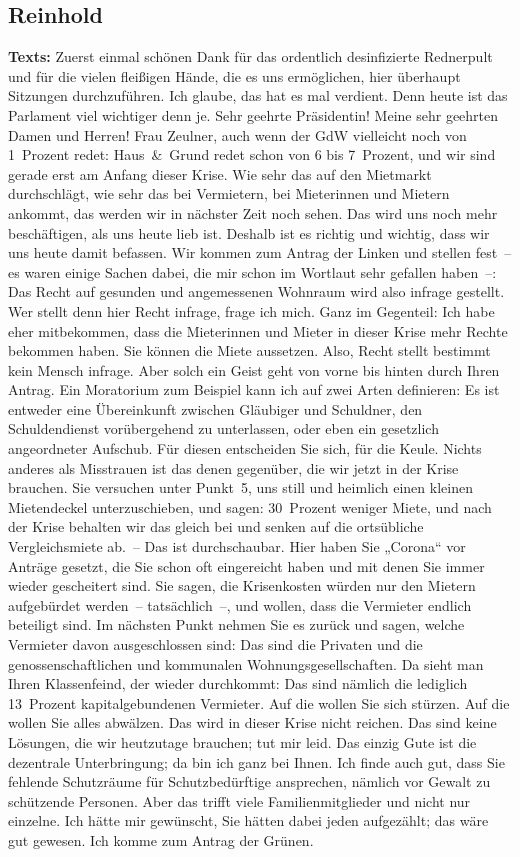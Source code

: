 \documentclass{article}
\begin{document}
\subsection{Reinhold}
\noindent\textbf{Texts:} Zuerst einmal schönen Dank für das ordentlich desinfizierte Rednerpult und für die vielen fleißigen Hände, die es uns ermöglichen, hier überhaupt Sitzungen durchzuführen.  Ich glaube, das hat es mal verdient. Denn heute ist das Parlament viel wichtiger denn je. Sehr geehrte Präsidentin! Meine sehr geehrten Damen und Herren! Frau Zeulner, auch wenn der GdW vielleicht noch von 1 Prozent redet: Haus \& Grund redet schon von 6 bis 7 Prozent, und wir sind gerade erst am Anfang dieser Krise. Wie sehr das auf den Mietmarkt durchschlägt, wie sehr das bei Vermietern, bei Mieterinnen und Mietern ankommt, das werden wir in nächster Zeit noch sehen. Das wird uns noch mehr beschäftigen, als uns heute lieb ist. Deshalb ist es richtig und wichtig, dass wir uns heute damit befassen. Wir kommen zum Antrag der Linken und stellen fest – es waren einige Sachen dabei, die mir schon im Wortlaut sehr gefallen haben –: Das Recht auf gesunden und angemessenen Wohnraum wird also infrage gestellt. Wer stellt denn hier Recht infrage, frage ich mich. Ganz im Gegenteil: Ich habe eher mitbekommen, dass die Mieterinnen und Mieter in dieser Krise mehr Rechte bekommen haben. Sie können die Miete aussetzen. Also, Recht stellt bestimmt kein Mensch infrage. Aber solch ein Geist geht von vorne bis hinten durch Ihren Antrag. Ein Moratorium zum Beispiel kann ich auf zwei Arten definieren: Es ist entweder eine Übereinkunft zwischen Gläubiger und Schuldner, den Schuldendienst vorübergehend zu unterlassen, oder eben ein gesetzlich angeordneter Aufschub. Für diesen entscheiden Sie sich, für die Keule. Nichts anderes als Misstrauen ist das denen gegenüber, die wir jetzt in der Krise brauchen.  Sie versuchen unter Punkt 5, uns still und heimlich einen kleinen Mietendeckel unterzuschieben, und sagen: 30 Prozent weniger Miete, und nach der Krise behalten wir das gleich bei und senken auf die ortsübliche Vergleichsmiete ab. – Das ist durchschaubar. Hier haben Sie „Corona“ vor Anträge gesetzt, die Sie schon oft eingereicht haben und mit denen Sie immer wieder gescheitert sind.  Sie sagen, die Krisenkosten würden nur den Mietern aufgebürdet werden – tatsächlich –, und wollen, dass die Vermieter endlich beteiligt sind. Im nächsten Punkt nehmen Sie es zurück und sagen, welche Vermieter davon ausgeschlossen sind: Das sind die Privaten und die genossenschaftlichen und kommunalen Wohnungsgesellschaften. Da sieht man Ihren Klassenfeind, der wieder durchkommt: Das sind nämlich die lediglich 13 Prozent kapitalgebundenen Vermieter. Auf die wollen Sie sich stürzen. Auf die wollen Sie alles abwälzen. Das wird in dieser Krise nicht reichen. Das sind keine Lösungen, die wir heutzutage brauchen; tut mir leid.  Das einzig Gute ist die dezentrale Unterbringung; da bin ich ganz bei Ihnen. Ich finde auch gut, dass Sie fehlende Schutzräume für Schutzbedürftige ansprechen, nämlich vor Gewalt zu schützende Personen. Aber das trifft viele Familienmitglieder und nicht nur einzelne. Ich hätte mir gewünscht, Sie hätten dabei jeden aufgezählt; das wäre gut gewesen. Ich komme zum Antrag der Grünen. 
\end{document}
